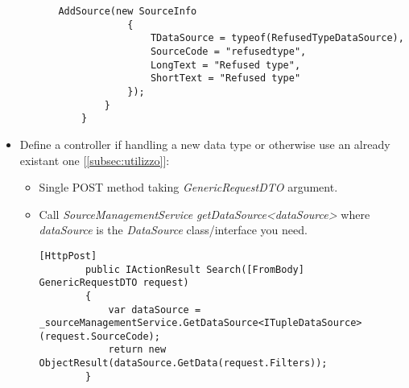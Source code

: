 \begin{itemize}
\begin{itemize}
\begin{itemize}
\begin{lstlisting}[caption={TupleDiscoveryConfiguration example}, style=javaScriptCode]
            AddSource(new SourceInfo
            {
                TDataSource = typeof(RefusedTypeDataSource),
                SourceCode = "refusedtype",
                LongText = "Refused type",
                ShortText = "Refused type"
            });
        }
    }                
            \end{lstlisting}
        \end{itemize}
    \end{itemize}
    \item Define a controller if handling a new data type or otherwise use an already existant one [\ref{subsec:utilizzo}]:
    \begin{itemize}
        \item Single POST method taking \textit{GenericRequestDTO} argument.
        \item Call \textit{SourceManagementService} \textit{getDataSource<dataSource>} where \textit{dataSource} is the \textit{DataSource} class/interface you need.
        \begin{lstlisting}[caption={HttpPost request in Controller example}, style=javaScriptCode]
        [HttpPost]
        public IActionResult Search([FromBody] GenericRequestDTO request)
        {
            var dataSource = _sourceManagementService.GetDataSource<ITupleDataSource>(request.SourceCode);
            return new ObjectResult(dataSource.GetData(request.Filters));
        }
        \end{lstlisting}
    \end{itemize}
\end{itemize}
